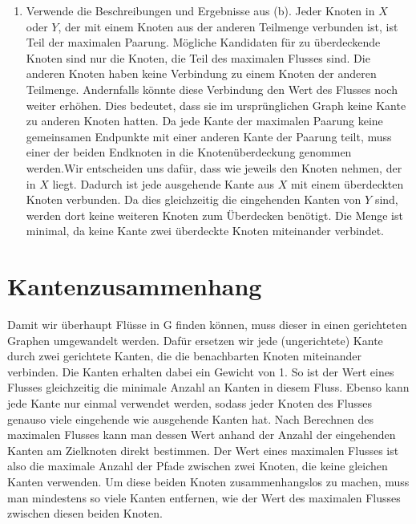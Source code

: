 \documentclass[a4paper,10pt]{article}
\begin{document}
\begin{enumerate}
\item Verwende die Beschreibungen und Ergebnisse aus (b). Jeder Knoten in $X$ oder $Y$, der mit einem Knoten aus der anderen Teilmenge verbunden ist, ist Teil der maximalen Paarung. Mögliche Kandidaten für zu überdeckende Knoten sind nur die Knoten, die Teil des maximalen Flusses sind. Die anderen Knoten haben keine Verbindung zu einem Knoten der anderen Teilmenge. Andernfalls könnte diese Verbindung den Wert des Flusses noch weiter erhöhen. Dies bedeutet, dass sie im ursprünglichen Graph keine Kante zu anderen Knoten hatten. Da jede Kante der maximalen Paarung keine gemeinsamen Endpunkte mit einer anderen Kante der Paarung teilt, muss einer der beiden Endknoten in die Knotenüberdeckung genommen werden.Wir entscheiden uns dafür, dass wie jeweils den Knoten nehmen, der in $X$ liegt. Dadurch ist jede ausgehende Kante aus $X$ mit einem überdeckten Knoten verbunden. Da dies gleichzeitig die eingehenden Kanten von $Y$ sind, werden dort keine weiteren Knoten zum Überdecken benötigt. Die Menge ist minimal, da keine Kante zwei überdeckte Knoten miteinander verbindet.
\end{enumerate}

\section{Kantenzusammenhang}
Damit wir überhaupt Flüsse in G finden können, muss dieser in einen gerichteten Graphen umgewandelt werden. Dafür ersetzen wir jede (ungerichtete) Kante durch zwei gerichtete Kanten, die die benachbarten Knoten miteinander verbinden. Die Kanten erhalten dabei ein Gewicht von 1. So ist der Wert eines Flusses gleichzeitig die minimale Anzahl an Kanten in diesem Fluss. Ebenso kann jede Kante nur einmal verwendet werden, sodass jeder Knoten des Flusses genauso viele eingehende wie ausgehende Kanten hat. Nach Berechnen des maximalen Flusses kann man dessen Wert anhand der Anzahl der eingehenden Kanten am Zielknoten direkt bestimmen. Der Wert eines maximalen Flusses ist also die maximale Anzahl der Pfade zwischen zwei Knoten, die keine gleichen Kanten verwenden.
Um diese beiden Knoten zusammenhangslos zu machen, muss man mindestens so viele Kanten entfernen, wie der Wert des maximalen Flusses zwischen diesen beiden Knoten.
\end{document}
